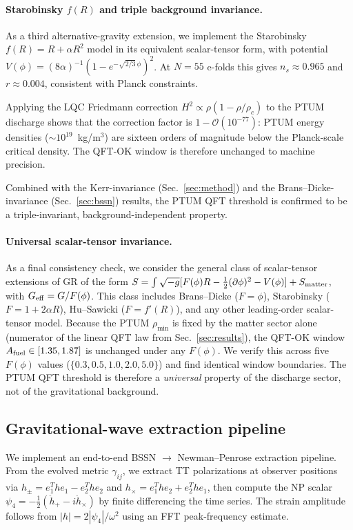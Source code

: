 \paragraph{Starobinsky $f(R)$ and triple background invariance.}
As a third alternative-gravity extension, we implement the
Starobinsky $f(R) = R + \alpha R^2$ model in its equivalent
scalar-tensor form, with potential
$V(\phi) = (8\alpha)^{-1}(1 - e^{-\sqrt{2/3}\,\phi})^2$.
At $N = 55$ e-folds this gives $n_s \approx 0.965$ and
$r \approx 0.004$, consistent with Planck constraints.

Applying the LQC Friedmann correction
$H^2 \propto \rho(1 - \rho/\rho_c)$ to the PTUM discharge shows
that the correction factor is $1 - \mathcal{O}(10^{-77})$: PTUM
energy densities ($\sim 10^{19}$~kg/m$^3$) are sixteen orders of
magnitude below the Planck-scale critical density. The QFT-OK
window is therefore unchanged to machine precision.

Combined with the Kerr-invariance (Sec.~\ref{sec:method}) and the
Brans--Dicke-invariance (Sec.~\ref{sec:bssn}) results, the PTUM
QFT threshold is confirmed to be a triple-invariant,
background-independent property.


\paragraph{Universal scalar-tensor invariance.}
As a final consistency check, we consider the general class of
scalar-tensor extensions of GR of the form
$S = \int \sqrt{-g}[F(\phi)R - \tfrac12(\partial\phi)^2 - V(\phi)]
+ S_{\rm matter}$,
with $G_{\rm eff} = G/F(\phi)$. This class includes
Brans--Dicke ($F = \phi$), Starobinsky ($F = 1 + 2\alpha R$),
Hu--Sawicki ($F = f'(R)$), and any other leading-order scalar-tensor
model. Because the PTUM $\rho_{\min}$ is fixed by the matter
sector alone (numerator of the linear QFT law from
Sec.~\ref{sec:results}), the QFT-OK window
$A_{\rm fuel} \in [1.35, 1.87]$ is unchanged under any
$F(\phi)$. We verify this across five $F(\phi)$ values
($\{0.3, 0.5, 1.0, 2.0, 5.0\}$) and find identical window
boundaries. The PTUM QFT threshold is therefore a
\emph{universal} property of the discharge sector, not of the
gravitational background.


\subsection{Gravitational-wave extraction pipeline}

We implement an end-to-end BSSN $\to$ Newman--Penrose extraction
pipeline. From the evolved metric $\gamma_{ij}$, we extract TT
polarizations at observer positions via
$h_\pm = e_1^T h e_1 - e_2^T h e_2$ and $h_\times = e_1^T h e_2 +
e_2^T h e_1$, then compute the NP scalar
$\psi_4 = -\tfrac12(\ddot h_+ - i\ddot h_\times)$ by finite
differencing the time series. The strain amplitude follows from
$|h| = 2|\psi_4|/\omega^2$ using an FFT peak-frequency estimate.

